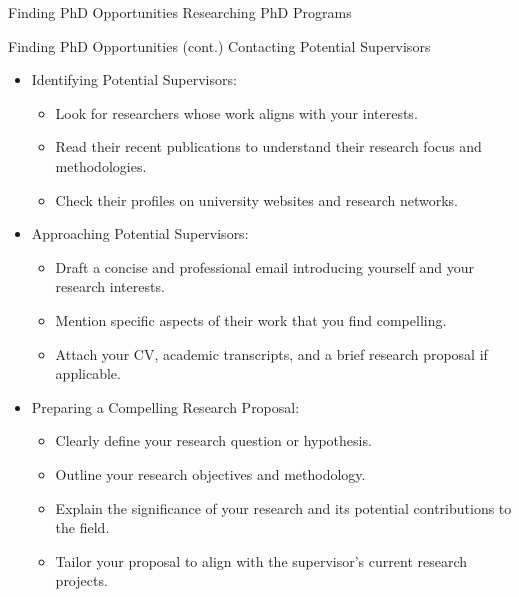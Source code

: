 \documentclass[10pt]{beamer}
\begin{document}
\begin{frame}[fragile]{Finding PhD Opportunities}
\alert{Researching PhD Programs}

	
\end{frame}

\begin{frame}[fragile]{Finding PhD Opportunities (cont.)}
\alert{Contacting Potential Supervisors}
	\begin{itemize}
		\item Identifying Potential Supervisors:
		\begin{itemize}
			\item Look for researchers whose work aligns with your interests.
			\item Read their recent publications to understand their research focus and methodologies.
			\item Check their profiles on university websites and research networks.
		\end{itemize}
		\item Approaching Potential Supervisors:
		\begin{itemize}
			\item Draft a concise and professional email introducing yourself and your research interests.
			\item Mention specific aspects of their work that you find compelling.
			\item Attach your CV, academic transcripts, and a brief research proposal if applicable.
		\end{itemize}
		\item Preparing a Compelling Research Proposal:
		\begin{itemize}
			\item Clearly define your research question or hypothesis.
			\item Outline your research objectives and methodology.
			\item Explain the significance of your research and its potential contributions to the field.
			\item Tailor your proposal to align with the supervisor’s current research projects.
		\end{itemize}
	\end{itemize}
	
\end{frame}
\end{document}
